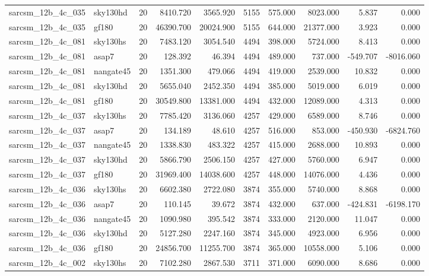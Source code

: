 \begin{tabular}{llrrrrrrrr}
sarcsm\_12b\_4c\_035 & sky130hd & 20 & 8410.720 & 3565.920 & 5155 & 575.000 & 8023.000 & 5.837 & 0.000 \\
sarcsm\_12b\_4c\_035 & gf180 & 20 & 46390.700 & 20024.900 & 5155 & 644.000 & 21377.000 & 3.923 & 0.000 \\
sarcsm\_12b\_4c\_081 & sky130hs & 20 & 7483.120 & 3054.540 & 4494 & 398.000 & 5724.000 & 8.413 & 0.000 \\
sarcsm\_12b\_4c\_081 & asap7 & 20 & 128.392 & 46.394 & 4494 & 489.000 & 737.000 & -549.707 & -8016.060 \\
sarcsm\_12b\_4c\_081 & nangate45 & 20 & 1351.300 & 479.066 & 4494 & 419.000 & 2539.000 & 10.832 & 0.000 \\
sarcsm\_12b\_4c\_081 & sky130hd & 20 & 5655.040 & 2452.350 & 4494 & 385.000 & 5019.000 & 6.019 & 0.000 \\
sarcsm\_12b\_4c\_081 & gf180 & 20 & 30549.800 & 13381.000 & 4494 & 432.000 & 12089.000 & 4.313 & 0.000 \\
sarcsm\_12b\_4c\_037 & sky130hs & 20 & 7785.420 & 3136.060 & 4257 & 429.000 & 6589.000 & 8.746 & 0.000 \\
sarcsm\_12b\_4c\_037 & asap7 & 20 & 134.189 & 48.610 & 4257 & 516.000 & 853.000 & -450.930 & -6824.760 \\
sarcsm\_12b\_4c\_037 & nangate45 & 20 & 1338.830 & 483.322 & 4257 & 415.000 & 2688.000 & 10.893 & 0.000 \\
sarcsm\_12b\_4c\_037 & sky130hd & 20 & 5866.790 & 2506.150 & 4257 & 427.000 & 5760.000 & 6.947 & 0.000 \\
sarcsm\_12b\_4c\_037 & gf180 & 20 & 31969.400 & 14038.600 & 4257 & 448.000 & 14076.000 & 4.436 & 0.000 \\
sarcsm\_12b\_4c\_036 & sky130hs & 20 & 6602.380 & 2722.080 & 3874 & 355.000 & 5740.000 & 8.868 & 0.000 \\
sarcsm\_12b\_4c\_036 & asap7 & 20 & 110.145 & 39.672 & 3874 & 432.000 & 637.000 & -424.831 & -6198.170 \\
sarcsm\_12b\_4c\_036 & nangate45 & 20 & 1090.980 & 395.542 & 3874 & 333.000 & 2120.000 & 11.047 & 0.000 \\
sarcsm\_12b\_4c\_036 & sky130hd & 20 & 5127.280 & 2247.160 & 3874 & 345.000 & 4923.000 & 6.956 & 0.000 \\
sarcsm\_12b\_4c\_036 & gf180 & 20 & 24856.700 & 11255.700 & 3874 & 365.000 & 10558.000 & 5.106 & 0.000 \\
sarcsm\_12b\_4c\_002 & sky130hs & 20 & 7102.280 & 2867.530 & 3711 & 371.000 & 6090.000 & 8.686 & 0.000 \\

\end{tabular}
